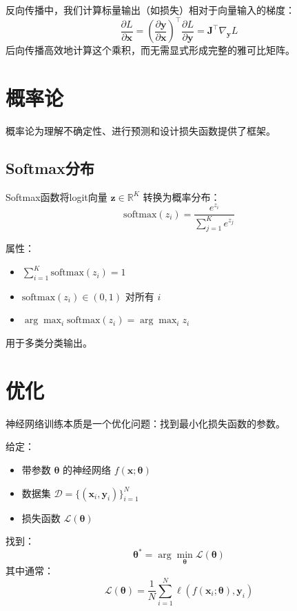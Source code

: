 \begin{property}[链式法则]
反向传播中，我们计算标量输出（如损失）相对于向量输入的梯度：
\begin{equation}
\frac{\partial L}{\partial \mathbf{x}} = \left(\frac{\partial \mathbf{y}}{\partial \mathbf{x}}\right)^\top \frac{\partial L}{\partial \mathbf{y}} = \mathbf{J}^\top \nabla_\mathbf{y} L
\end{equation}
后向传播高效地计算这个乘积，而无需显式形成完整的雅可比矩阵。
\end{property}

\section{概率论}

概率论为理解不确定性、进行预测和设计损失函数提供了框架。

\subsection{Softmax分布}

Softmax函数将logit向量 $\mathbf{z} \in \mathbb{R}^K$ 转换为概率分布：
\begin{equation}
\text{softmax}(z_i) = \frac{e^{z_i}}{\sum_{j=1}^{K} e^{z_j}}
\end{equation}

属性：
\begin{itemize}
    \item $\sum_{i=1}^{K} \text{softmax}(z_i) = 1$
    \item $\text{softmax}(z_i) \in (0, 1)$ 对所有 $i$
    \item $\arg\max_i \text{softmax}(z_i) = \arg\max_i z_i$
\end{itemize}

用于多类分类输出。

\section{优化}

神经网络训练本质是一个优化问题：找到最小化损失函数的参数。

\begin{problem}[神经网络训练]
给定：
\begin{itemize}
    \item 带参数 $\mathbf{\theta}$ 的神经网络 $f(\mathbf{x}; \mathbf{\theta})$
    \item 数据集 $\mathcal{D} = \{(\mathbf{x}_i, \mathbf{y}_i)\}_{i=1}^{N}$
    \item 损失函数 $\mathcal{L}(\mathbf{\theta})$
\end{itemize}
找到：
\begin{equation}
\mathbf{\theta}^* = \arg\min_{\mathbf{\theta}} \mathcal{L}(\mathbf{\theta})
\end{equation}
其中通常：
\begin{equation}
\mathcal{L}(\mathbf{\theta}) = \frac{1}{N}\sum_{i=1}^{N} \ell(f(\mathbf{x}_i; \mathbf{\theta}), \mathbf{y}_i)
\end{equation}
\end{problem}

